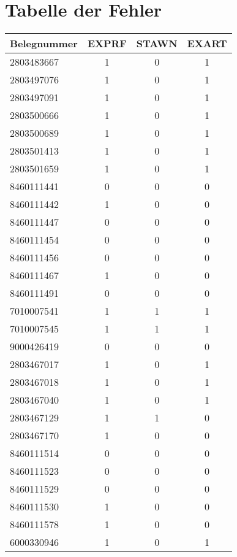 \section{Tabelle der Fehler}
\label{sec:Anhang2}

\begin{tabular}[ht]{|l|c|c|c|}
  \hline
  Belegnummer & EXPRF & STAWN & EXART\\
  \hline\hline
2803483667  &   1   &   0   &   1   \\ 
2803497076  &   1   &   0   &   1   \\ 
2803497091  &   1   &   0   &   1   \\ 
2803500666  &   1   &   0   &   1   \\ 
2803500689  &   1   &   0   &   1   \\ 
2803501413  &   1   &   0   &   1   \\ 
2803501659  &   1   &   0   &   1   \\ 
8460111441  &   0   &   0   &   0   \\ 
8460111442  &   1   &   0   &   0   \\ 
8460111447  &   0   &   0   &   0   \\ 
8460111454  &   0   &   0   &   0   \\ 
8460111456  &   0   &   0   &   0   \\ 
8460111467  &   1   &   0   &   0   \\ 
8460111491  &   0   &   0   &   0   \\ 
7010007541  &   1   &   1   &   1   \\ 
7010007545  &   1   &   1   &   1   \\ 
9000426419  &   0   &   0   &   0   \\ 
2803467017  &   1   &   0   &   1   \\ 
2803467018  &   1   &   0   &   1   \\ 
2803467040  &   1   &   0   &   1   \\ 
2803467129  &   1   &   1   &   0   \\ 
2803467170  &   1   &   0   &   0   \\ 
8460111514  &   0   &   0   &   0   \\ 
8460111523  &   0   &   0   &   0   \\ 
8460111529  &   0   &   0   &   0   \\ 
8460111530  &   1   &   0   &   0   \\ 
8460111578  &   1   &   0   &   0   \\ 
6000330946  &   1   &   0   &   1   \\ 

\end{tabular}
